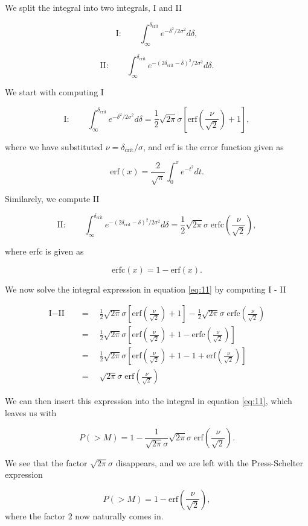 \documentclass[a4paper,10pt]{article}
\begin{document}
\noindent We split the integral into two integrals, I and II

\[
     \text{I}:\qquad  \int_\infty^{\delta_\text{crit}} e^{- \delta^2 /2 \sigma^2} d\delta,
\]

\[
    \text{II}:\qquad  \int_\infty^{\delta_\text{crit}} e^{- (2\delta_\text{crit} - \delta)^2/2 \sigma^2} d\delta.
\]

\noindent We start with computing I

\[
    \text{I}:\qquad  \int_\infty^{\delta_\text{crit}} e^{- \delta^2 /2 \sigma^2} d\delta = \frac{1}{2} \sqrt{2 \pi} \sigma\left[ \text{erf}  \left( \frac{\nu}{\sqrt{2}}\right) + 1 \right],
\]

\noindent where we have substituted $\nu = \delta_\text{crit}/ \sigma$, and erf is the error function given as 

\[
    \text{erf}(x) = \frac{2}{\sqrt{\pi}} \int_0^x e^{-t^2} dt.
\]

\noindent Similarely, we compute II

\[
    \text{II}:\qquad  \int_\infty^{\delta_\text{crit}} e^{- (2\delta_\text{crit} - \delta)^2/2 \sigma^2} d\delta = \frac{1}{2} \sqrt{2 \pi} \sigma \; \text{erfc} \left( \frac{\nu}{\sqrt{2}}\right),
\]

\noindent where erfc is given as

\[
    \text{erfc}(x) = 1 - \text{erf}(x).
\]

\noindent We now solve the integral expression in equation \eqref{eq:11} by computing I - II

\begin{align*}
\text{I} - \text{II} \quad & = \quad   \frac{1}{2} \sqrt{2 \pi} \sigma\left[ \text{erf}  \left( \frac{\nu}{\sqrt{2}}\right) + 1 \right] - \frac{1}{2} \sqrt{2 \pi} \sigma \; \text{erfc} \left( \frac{\nu}{\sqrt{2}}\right)
\\
& = \quad \frac{1}{2} \sqrt{2\pi} \sigma \left[\text{erf}  \left( \frac{\nu}{\sqrt{2}}\right) + 1 - \text{erfc} \left( \frac{\nu}{\sqrt{2}}\right) \right]
\\
& = \quad \frac{1}{2} \sqrt{2\pi} \sigma \left[\text{erf}  \left( \frac{\nu}{\sqrt{2}}\right) + 1 - 1 + \text{erf} \left( \frac{\nu}{\sqrt{2}}\right) \right]
\\
& = \quad \sqrt{2\pi} \sigma \; \text{erf}  \left( \frac{\nu}{\sqrt{2}}\right)
\end{align*}

\noindent We can then insert this expression into the integral in equation \eqref{eq:11}, which leaves us with

\[
    P(> M) = 1 - \frac{1}{\sqrt{2 \pi} \sigma}\sqrt{2\pi} \sigma \; \text{erf}  \left( \frac{\nu}{\sqrt{2}}\right).
\]

\noindent We see that the factor $\sqrt{2\pi}\sigma$ disappears, and we are left with the Press-Schelter expression

\begin{equation}
     P(> M) = 1 - \text{erf}  \left( \frac{\nu}{\sqrt{2}}\right),
\end{equation}
where the factor $2$ now naturally comes in.
\end{document}
